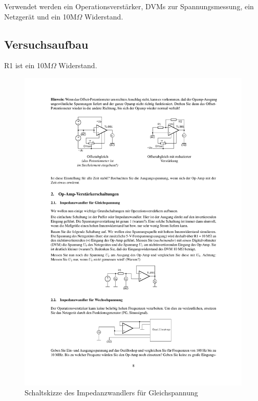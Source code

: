\documentclass[12pt,a4paper]{article}
\begin{document}
Verwendet werden ein Operationsverstärker, DVMs zur Spannungsmessung, ein Netzgerät und ein 10M$\Omega$ Widerstand.

\subsection{Versuchsaufbau}

R1 ist ein 10M$\Omega$ Widerstand.

\begin{figure}[H] 
  \centering
    \includegraphics[trim = 10mm 90mm 10mm 180mm, clip, scale = 1]{ep4_14[Page8].pdf}
  	\caption[Schaltskizze des Impedanzwandlers für Gleichspannung]{Schaltskizze des Impedanzwandlers für Gleichspannung\footnotemark}
  \label{fig:1}
\end{figure}
\end{document}

